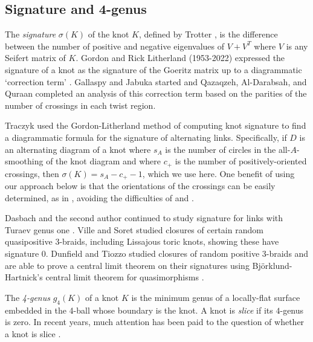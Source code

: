 \documentclass[12pt]{amsart}
\theoremstyle{definition}
\theoremstyle{remark}
\numberwithin{equation}{section}
\begin{document}
\subsection{Signature and 4-genus}  
The \textit{signature} $\sigma(K)$ of the knot $K$, defined by Trotter \cite{Trotter}, is the difference between the number of positive and negative eigenvalues of $V+V^T$ where $V$ is any Seifert matrix of $K$.  Gordon and Rick Litherland (1953-2022) expressed the signature of a knot as the signature of the Goeritz matrix up to a diagrammatic `correction term' \cite[Theorem 2]{GorLit}.  Gallaspy and Jabuka  started \cite{GalJab} and Qazaqzeh, Al-Darabsah, and Quraan completed \cite{QazAlDQur} an analysis of this correction term  based on the parities of the number of crossings in each twist region.


Traczyk \cite{Tra} used the Gordon-Litherland method of computing knot signature to find a diagrammatic formula for the signature of alternating links. Specifically, if $D$ is an alternating diagram of a knot where $s_A$ is the number of circles in the all-$A$-smoothing of the knot diagram and where $c_+$ is the number of positively-oriented crossings, then $\sigma(K)=s_A - c_+ -1$, which we use here.  One benefit of using our approach below is that the orientations of the crossings can be easily determined, as in \cite{Coh:lower}, avoiding the difficulties of \cite{GalJab} and \cite{QazAlDQur}.


Dasbach and the second author continued to study signature for links with Turaev genus one \cite{DasLow:gT1}.  Ville and Soret \cite{SorVil} studied closures of certain random quasipositive 3-braids, including Lissajous toric knots, showing these have signature 0.  Dunfield and Tiozzo \cite{DunTio} studied closures of random positive 3-braids and are able to prove a central limit theorem on their signatures using Bj\"orklund-Hartnick's central limit theorem for quasimorphisms \cite{BjoHar}.


The \emph{4-genus} $g_4(K)$ of a knot $K$ is the minimum genus of a locally-flat surface embedded in the 4-ball whose boundary is the knot.  A knot is \emph{slice} if its $4$-genus is zero.  In recent years, much attention has been paid to the question of whether a knot is slice \cite{Pic:slice,Hom:slice,Lev:slice}.
\end{document}
